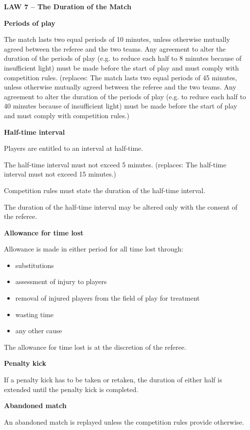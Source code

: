\clearpage
\sffamily
{\bfseries\color[rgb]{0.4,0.4,0.4}
LAW 7 -- The Duration of the Match}

\bigskip

{\bfseries Periods of play }

\headlinebox

The match lasts two equal periods of 10 minutes, unless otherwise mutually agreed between the referee and the two teams. Any agreement to alter the duration of the periods of play (e.g. to reduce each half to 8 minutes because of insufficient light) must be made before the start of play and must comply with competition rules.
\textcolor[rgb]{0.4,0.4,0.4}{(replaces: The match lasts two equal periods of 45 minutes, unless otherwise mutually agreed between the referee and the two teams. Any agreement to alter the duration of the periods of play (e.g. to reduce each half to 40 minutes because of
insufficient light) must be made before the start of play and must comply with competition rules.)}

\bigskip

{\bfseries Half-time interval}

\headlinebox

Players are entitled to an interval at half-time.

The half-time interval must not exceed 5 minutes.
\textcolor[rgb]{0.4,0.4,0.4}{(replaces: The half-time interval must not exceed 15 minutes.) }

Competition rules must state the duration of the half-time interval.

The duration of the half-time interval may be altered only with the consent of the referee. 

\bigskip

{\bfseries Allowance for time lost}

\headlinebox

Allowance is made in either period for all time lost through: 

\begin{itemize}
\item substitutions
\item assessment of injury to players
\item removal of injured players from the field of play for treatment 
\item wasting time
\item any other cause
\end{itemize}

The allowance for time lost is at the discretion of the referee.

\bigskip

{\bfseries Penalty kick}

\headlinebox

If a penalty kick has to be taken or retaken, the duration of either half is extended until the penalty kick is completed.

\bigskip

{\sffamily
\textbf{Abandoned match} }

\headlinebox

An abandoned match is replayed unless the competition rules provide otherwise.